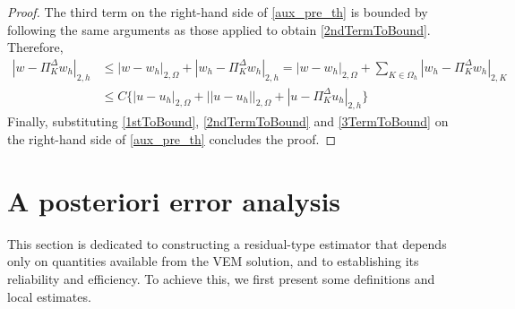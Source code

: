 \documentclass[final,reqno]{elsarticle}
\def\O{\Omega}
\def\PiK{\Pi_{K}^{\Delta}}
\begin{document}
\begin{proof}
The third term on the right-hand side of \eqref{aux_pre_th} is bounded by following the same arguments as those applied to obtain \eqref{2ndTermToBound}. Therefore,
\begin{align}
|w-\PiK w_h|_{2,h}&\leq |w-w_h|_{2,\Omega}+|w_h-\PiK   w_h|_{2,h}=|w-w_h|_{2,\Omega}+\sum\limits_{K\in \Omega_h}|w_h-\PiK   w_h|_{2,K}\nonumber\\
&\leq C\Big\{|u-u_h|_{2,\Omega}+ ||u-u_h||_{2,\O}+|u-\PiK u_h|_{2,h}\Big\}\label{3TermToBound}
\end{align}
Finally, substituting  \eqref{1stToBound}, \eqref{2ndTermToBound} and \eqref{3TermToBound} on the right-hand side of \eqref{aux_pre_th} concludes the proof.
\end{proof}











\setcounter{equation}{0}
\section{A posteriori error analysis}
\label{SEC:EST_A_POST}
This section is dedicated to constructing a residual-type estimator that depends only on quantities available from the VEM solution, and to establishing its reliability and efficiency. To achieve this, we first present some definitions and local estimates.
\end{document}
